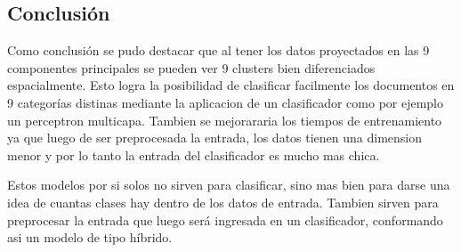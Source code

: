\subsection{Conclusión}
Como conclusión se pudo destacar que al tener los datos proyectados en las 9 componentes principales se pueden ver 9 clusters bien diferenciados espacialmente.
Esto logra la posibilidad de clasificar facilmente los documentos en 9 categorías distinas mediante la aplicacion de un clasificador como por ejemplo un perceptron multicapa.
Tambien se mejorararia los tiempos de entrenamiento ya que luego de ser preprocesada la entrada, los datos tienen una dimension menor y por lo tanto la entrada del clasificador
es mucho mas chica.

Estos modelos por si solos no sirven para clasificar, sino mas bien para darse una idea de cuantas clases hay dentro de los datos de entrada. Tambien sirven para preprocesar
 la entrada que luego será ingresada en un clasificador, conformando asi un modelo de tipo híbrido.
\newpage
